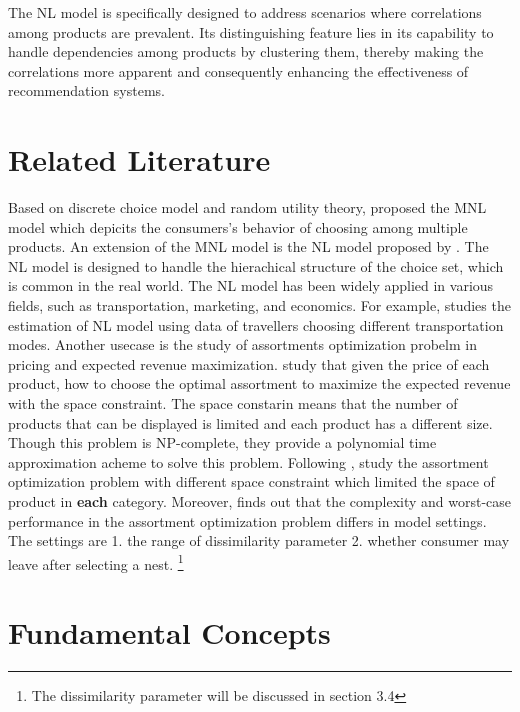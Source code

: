 \documentclass[12pt]{article}
\theoremstyle{definition}
\begin{document}
\begin{sloppypar}
The NL model is specifically designed to address scenarios where correlations among products are prevalent. Its distinguishing feature lies in its capability to handle dependencies among products by clustering them, thereby making the correlations more apparent and consequently enhancing the effectiveness of recommendation systems.

\section{Related Literature}
Based on discrete choice model and random utility theory, \textcite{mcfadden1972} proposed the MNL model which depicits the consumers's behavior of choosing among multiple products. An extension of the MNL model is the NL model proposed by \textcite{williams1977}. The NL model is designed to handle the hierachical structure of the choice set, which is common in the real world. The NL model has been widely applied in various fields, such as transportation, marketing, and economics. For example, \textcite{hensher2002} studies the estimation of NL model using data of travellers choosing different transportation modes. Another usecase is the study of assortments optimization probelm in pricing and expected revenue maximization. \textcite{rusmevichientong2009} study that given the price of each product, how to choose the optimal assortment to maximize the expected revenue with the space constraint. The space constarin means that the number of products that can be displayed is limited and each product has a different size. Though this problem is NP-complete, they provide a polynomial time approximation acheme to solve this problem. Following \textcite{rusmevichientong2009}, \textcite{gallego2014} study the assortment optimization problem with different space constraint which limited the space of product in \textbf{each} category. Moreover, \textcite{davis2014} finds out that the complexity and worst-case performance in the assortment optimization problem differs in model settings. The settings are 1. the range of dissimilarity parameter 2. whether consumer may leave after selecting a nest. \footnote{The dissimilarity parameter will be discussed in section 3.4}

\section{Fundamental Concepts}

\end{sloppypar}
\end{document}
